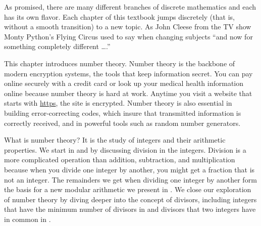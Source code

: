 
As promised, there are many different branches of discrete mathematics and each has its own flavor.  Each chapter of this textbook jumps discretely (that is, without a smooth transition) to a new topic.  As John Cleese from the TV show Monty Python's Flying Circus used to say when changing subjects ``and now for something completely different \ldots.'' 

This chapter introduces number theory.  Number theory is the backbone of modern encryption systems, the tools that keep information secret.  You can pay online securely with a credit card or look up your medical health information online because number theory is hard at work.  Anytime you visit a website that starts with \url{https}, the site is encrypted.  Number theory is also essential in building error-correcting codes, which insure that transmitted information is correctly received, and in powerful tools such as random number generators.

What is number theory?  It is the study of integers and their arithmetic properties.  We start in  {\secintegerdivision} and  {\secdivalg} by discussing division in the integers.  Division is a more complicated operation than addition, subtraction, and multiplication because when you divide one integer by another, you might get a fraction that is not an integer. The remainders we get when dividing one integer by another form the basis for a new modular arithmetic we present in  {\secmodarith}.  We close our exploration of number theory by diving deeper into the concept of divisors, including integers that have the minimum number of divisors in  {\secprimes} and divisors that two integers have in common in  {\secgcd}.


